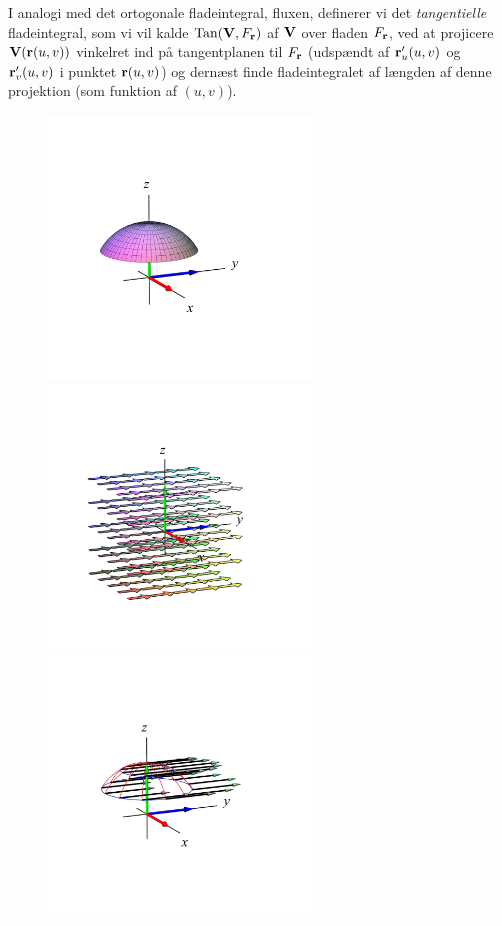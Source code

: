 \begin{definition} \label{defTangFladeInt}
I analogi med det ortogonale fladeintegral, fluxen,  definerer vi det {\em
tangentielle} fladeintegral, som vi vil kalde  $\operatorname{Tan}({\bf V},
F_{\bf r})$ af ${\bf V}$ over fladen $F_{\bf r}$,
ved at projicere ${\bf V}({\bf r}(u,v))$
vinkelret ind på tangentplanen til $F_{\bf r}$
(udspændt af ${\bf r}'_{u}(u,v)$ og ${\bf
r}'_{v}(u,v)$ i punktet ${\bf r}(u,v)$) og
dernæst finde fladeintegralet af længden af denne
projektion (som funktion af $(u, v)$).
\end{definition}



\begin{figure}[h]
\centerline{\includegraphics[width=70mm]{FIGS/plotKalotA1}\includegraphics[width=70mm]{FIGS/plotKalotB2}\includegraphics[width=70mm]{FIGS/plotKalotB3}}

\end{figure}
